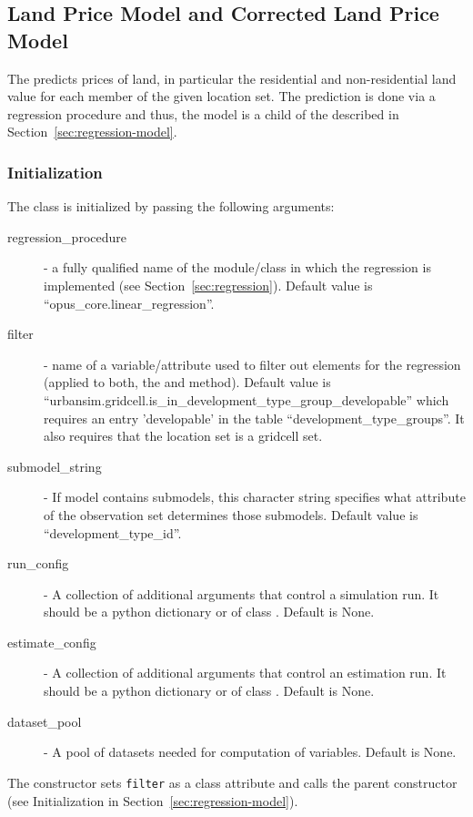 \subsection{Land Price Model and Corrected Land Price Model}
\label{sec:land-price-model} 
%
The   
predicts prices of land, in particular the
residential and non-residential land value for each member of the given
location set. The prediction is done via a regression procedure and thus,
the model is a child of the   described in
Section~\ref{sec:regression-model}.

\subsubsection{Initialization}
%
The class is initialized by passing the following arguments:
\begin{description}
\item[regression_procedure] - a fully qualified name of the module/class in
  which the regression is implemented (see
  Section~\ref{sec:regression}). Default value is
  ``opus_core.linear_regression''.
\item[filter] - name of a variable/attribute used to filter out elements for
  the regression (applied to both, the  and 
  method). Default value is
  ``urbansim.gridcell.is_in_development_type_group_developable'' which requires an entry 'developable'
  in the table ``development_type_groups''. %
  It also requires that the location set is a gridcell set.
\item[submodel_string] - If model contains submodels, this character string
  specifies what attribute of the observation set determines those
  submodels. Default value is ``development_type_id''.
\item[run_config] - A collection of additional arguments that control a
  simulation run. It should be a python dictionary or of class . Default is None.
\item[estimate_config] - A collection of additional arguments that control an
  estimation run. It should be a python dictionary or of class . Default is None.
  \item[dataset_pool] - A pool of datasets needed for computation of variables. Default is None.
\end{description}
The constructor sets \verb|filter| as a class attribute and calls the parent
constructor (see Initialization in Section~\ref{sec:regression-model}).

